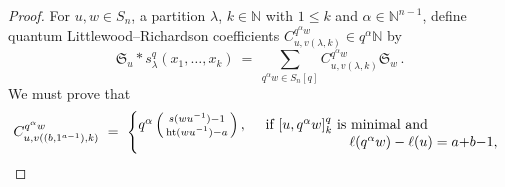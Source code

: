 \documentclass[11pt]{article}
\theoremstyle{definition}
\numberwithin{equation}{section}
\newcommand{\NN}{{\mathbb N}}
\newcommand{\frakS}{{\mathfrak S}}
\DeclareMathOperator{\het}{ht}
\begin{document}
\begin{proof}
    For  $u,w \in S_n$, a partition $\lambda$, $k \in \NN$ with $1\leq k$ and $\alpha\in \NN^{n-1}$, define
    quantum Littlewood--Richardson coefficients $C^{q^\alpha w}_{u,v(\lambda,k)}\in q^\alpha \NN$ by 
    \begin{equation}
        \label{eq-definition-Cq}
        \frakS_u \ast s^q_\lambda(x_1, \ldots, x_k)
        \ =\ \sum_{q^\alpha w \in S_n[q]} C^{q^\alpha w}_{u,v(\lambda,k)} \frakS_w\,.
    \end{equation}
    We must prove that
    \begin{equation*}
        C^{q^\alpha w}_{u,v((b, 1^{a-1}),k)}\ =\ 
        \begin{cases}
            q^\alpha \left(\begin{smallmatrix} s(wu^{-1})-1 \\ \het(wu^{-1})-a \end{smallmatrix}\right),
            &
            \begin{array}[t]{lr}
                \text{if $[u, q^{\alpha}w]_k^q$ is minimal and} \\[-0.5ex]
                \qquad\qquad\qquad \text{$\ell(q^\alpha w) - \ell(u) = a{+}b{-}1$,}
            \end{array}
            

\end{cases}
\end{equation*}
\end{proof}
\end{document}
